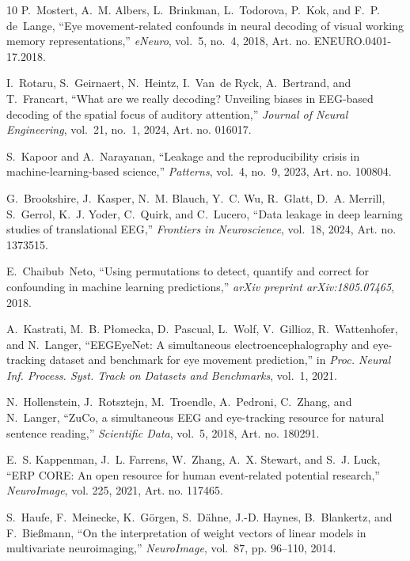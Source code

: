 \documentclass[conference]{IEEEtran}
\begin{document}
\begin{thebibliography}{10}
P.~Mostert, A.~M. Albers, L.~Brinkman, L.~Todorova, P.~Kok, and F.~P. de~Lange,
  ``Eye movement-related confounds in neural decoding of visual working memory
  representations,'' \emph{eNeuro}, vol.~5, no.~4, 2018, Art. no.
  ENEURO.0401-17.2018.

I.~Rotaru, S.~Geirnaert, N.~Heintz, I.~Van~de Ryck, A.~Bertrand, and
  T.~Francart, ``What are we really decoding? {U}nveiling biases in {EEG}-based
  decoding of the spatial focus of auditory attention,'' \emph{Journal of
  Neural Engineering}, vol.~21, no.~1, 2024, Art. no. 016017.

S.~Kapoor and A.~Narayanan, ``Leakage and the reproducibility crisis in
  machine-learning-based science,'' \emph{Patterns}, vol.~4, no.~9, 2023, Art. no.
  100804.

G.~Brookshire, J.~Kasper, N.~M. Blauch, Y.~C. Wu, R.~Glatt, D.~A. Merrill,
  S.~Gerrol, K.~J. Yoder, C.~Quirk, and C.~Lucero, ``Data leakage in deep
  learning studies of translational {EEG},'' \emph{Frontiers in Neuroscience},
  vol.~18, 2024, Art. no. 1373515.

E.~Chaibub~Neto, ``Using permutations to detect, quantify and correct for
  confounding in machine learning predictions,'' \emph{arXiv preprint
  arXiv:1805.07465}, 2018.

A.~Kastrati, M.~B. P{\l}omecka, D.~Pascual, L.~Wolf, V.~Gillioz,
  R.~Wattenhofer, and N.~Langer, ``{EEGEyeNet}: A simultaneous
  electroencephalography and eye-tracking dataset and benchmark for eye
  movement prediction,'' in \emph{Proc. Neural Inf. Process. Syst. Track on
  Datasets and Benchmarks}, vol.~1, 2021.

N.~Hollenstein, J.~Rotsztejn, M.~Troendle, A.~Pedroni, C.~Zhang, and N.~Langer,
  ``{ZuCo}, a simultaneous {EEG} and eye-tracking resource for natural sentence
  reading,'' \emph{Scientific Data}, vol.~5, 2018, Art. no. 180291.

E.~S. Kappenman, J.~L. Farrens, W.~Zhang, A.~X. Stewart, and S.~J. Luck, ``{ERP
  CORE}: An open resource for human event-related potential research,''
  \emph{NeuroImage}, vol. 225, 2021, Art. no. 117465.

S.~Haufe, F.~Meinecke, K.~G{\"o}rgen, S.~D{\"a}hne, J.-D. Haynes, B.~Blankertz,
  and F.~Bie{\ss}mann, ``On the interpretation of weight vectors of linear
  models in multivariate neuroimaging,'' \emph{NeuroImage}, vol.~87, pp.
  96--110, 2014.


\end{thebibliography}
\end{document}
